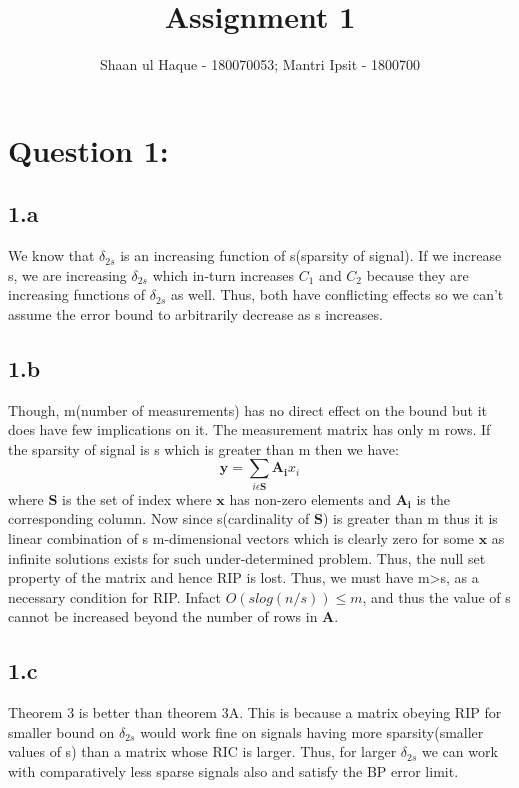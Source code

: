 \documentclass[12pt]{article}
\title{Assignment 1}
\author{Shaan ul Haque - 180070053; Mantri Ipsit - 1800700}
\begin{document}
\maketitle

\section*{Question 1:}
\subsection*{1.a}
We know that $\delta_{2s}$ is an increasing function of s(sparsity of signal). If we increase s, we are increasing $\delta_{2s}$ which in-turn increases $C_1$ and $C_2$ because they are increasing functions of $\delta_{2s}$ as well. Thus, both have conflicting effects so we can't assume the error bound to arbitrarily decrease as s increases. 
\subsection*{1.b}
Though, m(number of measurements) has no direct effect on the bound but it does have few implications on it. The measurement matrix has only m rows. If the sparsity of signal is s which is greater than m then we have:
\begin{equation*}
    \boldsymbol{y} = \sum_{i\epsilon\boldsymbol{S}}\boldsymbol{A_i}x_i
\end{equation*}
where $\boldsymbol{S}$ is the set of index where $\boldsymbol{x}$ has non-zero elements and $\boldsymbol{A_i}$ is the corresponding column. Now since s(cardinality of $\boldsymbol{S}$) is greater than m thus it is linear combination of s m-dimensional vectors which is clearly zero for some $\boldsymbol{x}$ as infinite solutions exists for such under-determined problem. Thus, the null set property of the matrix and hence RIP is lost. Thus, we must have m>s, as a necessary condition for RIP. Infact $O(slog(n/s))\leq m$, and thus the value of s cannot be increased beyond the number of rows in $\boldsymbol{A}$.
\subsection*{1.c}
Theorem 3 is better than theorem 3A. This is because a matrix obeying RIP for smaller bound on $\delta_{2s}$ would work fine on signals having more sparsity(smaller values of s) than a matrix whose RIC is larger. Thus, for larger $\delta_{2s}$ we can work with comparatively less sparse signals also and satisfy the BP error limit.
\end{document}
